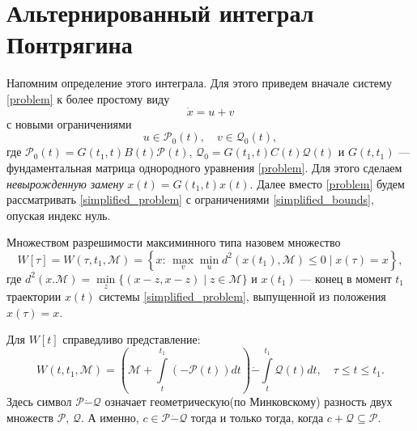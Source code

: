 \section{Альтернированный интеграл Понтрягина}
Напомним определение этого интеграла. Для этого приведем вначале систему 
 \eqref{problem} к более простому виду
\begin{equation}\label{simplified_problem}
    \dot{x} = u + v
\end{equation}
 с новыми ограничениями
\begin{equation}\label{simplified_bounds}
    u \in \mathcal{P}_0(t), \quad v \in \mathcal{Q}_0(t),
\end{equation}
 где \( \mathcal{P}_0(t) = G(t_1, t) B(t) \mathcal{P}(t), \, \mathcal{Q}_0 = 
 G(t_1,t)C(t)\mathcal{Q}(t) \) и \( G(t,t_1) \) --- фундаментальная матрица
 однородного уравнения \eqref{problem}. Для этого сделаем \emph{невырожденную замену} 
 \( x(t) = G(t_1, t)x(t) \). Далее вместо \eqref{problem} будем
 рассматривать \eqref{simplified_problem} с ограничениями \eqref{simplified_bounds}, 
 опуская индекс нуль.
\begin{definition}
    Множеством разрешимости максиминного типа назовем множество
    \begin{equation}\label{maxmin_solvability_set}
        W[\tau] = W(\tau, t_1, \mathcal{M}) = \left\{ x: \, \max_v \min_u
         d^2(x(t_1), \mathcal{M}) \le 0 \mid x(\tau) = x \right\}, 
    \end{equation}
     где \( d^2(x. \mathcal{M}) = \min\limits_z \{ (x-z,x-z) \mid z \in 
     \mathcal{M} \} \) и \( x(t_1) \) --- конец в момент \( t_1 \) траектории
     \( x(t) \) системы \eqref{simplified_problem}, выпущенной из положения 
     \( x(\tau) = x \).
\end{definition}
\begin{statement}
    Для \( W[t] \) справедливо представление:
    \begin{equation}\label{solvability_set_format}
        W(t,t_1,\mathcal{M}) = \left( \mathcal{M} + \int\limits_t^{t_1} 
         (-\mathcal{P}(t)) dt \right) \dot{-} \int\limits_t^{t_1} \mathcal{Q}(t) dt,
         \quad \tau \le t \le t_1.
    \end{equation}
    Здесь символ \( \mathcal{P} \dot{-} \mathcal{Q} \) означает геометрическую(по 
     Минковскому) разность двух множеств \( \mathcal{P}, \, \mathcal{Q}\). А именно,
     \( c \in \mathcal{P} \dot{-} \mathcal{Q} \) тогда и только тогда, когда \(c +
     \mathcal{Q} \subseteq \mathcal{P} \).
\end{statement}
